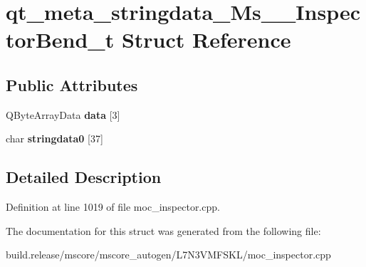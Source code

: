 \hypertarget{structqt__meta__stringdata___ms_____inspector_bend__t}{}\section{qt\+\_\+meta\+\_\+stringdata\+\_\+\+Ms\+\_\+\+\_\+\+Inspector\+Bend\+\_\+t Struct Reference}
\label{structqt__meta__stringdata___ms_____inspector_bend__t}
\subsection*{Public Attributes}
\begin{DoxyCompactItemize}
\item 
\mbox{\label{structqt__meta__stringdata___ms_____inspector_bend__t_aace819274760ee05a45b82d6b098ee6c}} 
Q\+Byte\+Array\+Data {\bfseries data} \mbox{[}3\mbox{]}
\item 
\mbox{\label{structqt__meta__stringdata___ms_____inspector_bend__t_a04e47fdd774426b741e597146ef9e09a}} 
char {\bfseries stringdata0} \mbox{[}37\mbox{]}
\end{DoxyCompactItemize}


\subsection{Detailed Description}


Definition at line 1019 of file moc\+\_\+inspector.\+cpp.



The documentation for this struct was generated from the following file\+:\begin{DoxyCompactItemize}
\item 
build.\+release/mscore/mscore\+\_\+autogen/\+L7\+N3\+V\+M\+F\+S\+K\+L/moc\+\_\+inspector.\+cpp\end{DoxyCompactItemize}
